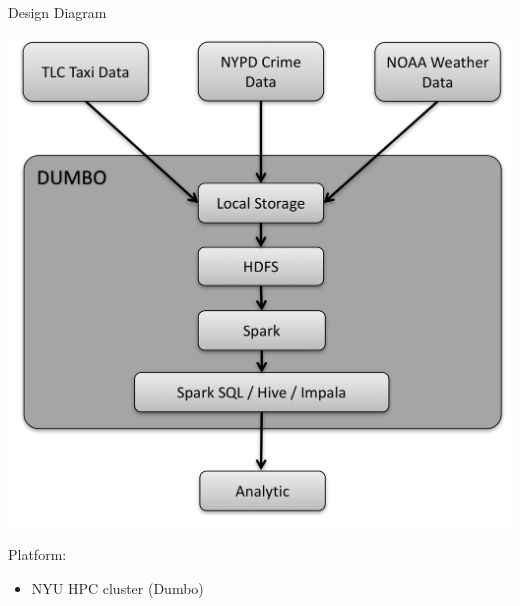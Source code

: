 \documentclass[10pt,ignorenonframetext,]{beamer}
\providecommand{\tightlist}{%
  \setlength{\itemsep}{0pt}\setlength{\parskip}{0pt}}
\begin{document}
\begin{frame}{%
\protect\hypertarget{design-diagram}{%
Design Diagram}}

\begin{center}
\includegraphics[height=.6\textheight]{img/DesignFlowDiagram.jpg}
\end{center}

\begin{block}{Platform:}

\begin{itemize}
\tightlist
\item
  NYU HPC cluster (Dumbo)
\end{itemize}

\end{block}

\end{frame}
\end{document}
